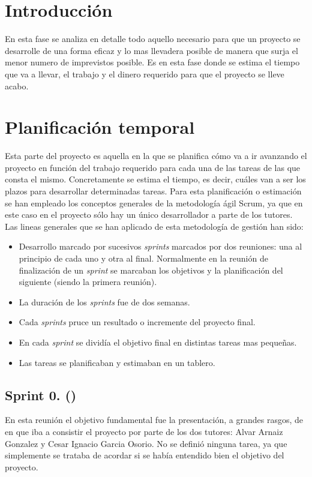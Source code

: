 
\section{Introducción}
En esta fase se analiza en detalle todo aquello necesario para que un proyecto se desarrolle de una forma eficaz y lo mas llevadera posible de manera que surja el menor numero de imprevistos posible.
Es en esta fase donde se estima el tiempo que va a llevar, el trabajo y el dinero requerido para que el proyecto se lleve acabo.

\section{Planificación temporal}
Esta parte del proyecto es aquella en la que se planifica cómo va a ir avanzando el proyecto en función del trabajo requerido para cada una de las tareas de las que consta el mismo.
Concretamente se estima el tiempo, es decir, cuáles van a ser los plazos para desarrollar determinadas tareas.
Para esta planificación o estimación se han empleado los conceptos generales de la metodología ágil Scrum, ya que en este caso en el proyecto sólo hay un único desarrollador a parte de los tutores. Las lineas generales que se han aplicado de esta metodología de gestión han sido:
\begin{itemize}
	\tightlist
	\item
	Desarrollo marcado por sucesivos \emph{sprints} marcados por dos reuniones: una al principio de cada uno y otra al final. Normalmente en la reunión de finalización de un \emph{sprint} se marcaban los objetivos y la planificación del siguiente (siendo la primera reunión).
	\item
	La duración de los \emph{sprints} fue de dos semanas.
	\item
	Cada \emph{sprints} pruce un resultado o incremente del proyecto final.
	\item
	En cada \emph{sprint} se dividía el objetivo final en distintas tareas mas pequeñas.
	\item
	Las tareas se planificaban y estimaban en un tablero.
\end{itemize}

\subsection{Sprint 0. ()}
En esta reunión el objetivo fundamental fue la presentación, a grandes rasgos, de en que iba a consistir el proyecto por parte de los dos tutores: Alvar Arnaiz Gonzalez y Cesar Ignacio Garcia Osorio.
No se definió ninguna tarea, ya que simplemente se trataba de acordar si se había entendido bien el objetivo del proyecto.

